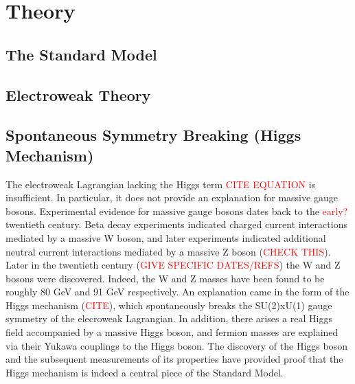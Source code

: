\chapter{Theory}

\section{The Standard Model}

\section{Electroweak Theory}


\section{Spontaneous Symmetry Breaking (Higgs Mechanism)}
The electroweak Lagrangian lacking the Higgs term \textcolor{red}{CITE EQUATION} is insufficient. In particular, it does not provide
an explanation for massive gauge bosons. Experimental evidence for massive gauge bosons dates back to the \textcolor{red}{early?}
twentieth century. Beta decay experiments indicated charged current interactions mediated by a massive W boson, and later experiments 
indicated additional neutral current interactions mediated by a massive Z boson (\textcolor{red}{CHECK THIS}). Later in the twentieth 
century (\textcolor{red}{GIVE SPECIFIC DATES/REFS}) the W and Z bosons were discovered. Indeed, the W and Z masses have been found 
to be roughly 80 GeV and 91 GeV respectively. An explanation came in the form of the Higgs mechanism (\textcolor{red}{CITE}),
which spontaneously breaks the SU(2)xU(1) gauge symmetry of the elecroweak Lagrangian. In addition, there arises a real 
Higgs field accompanied by a massive Higgs boson, and fermion masses are explained via their Yukawa couplings to the Higgs boson. 
The discovery of the Higgs boson and the subsequent measurements of its properties have provided proof that the Higgs mechanism 
is indeed a central piece of the Standard Model. 

